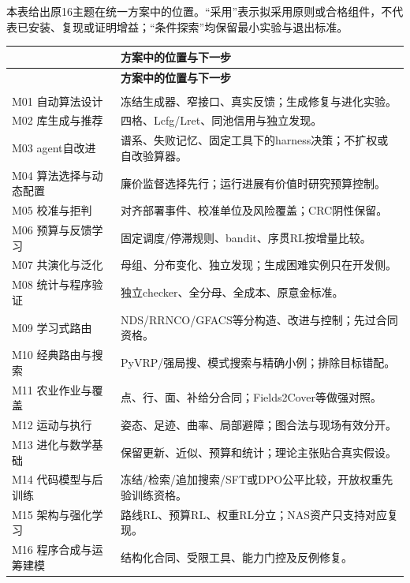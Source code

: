 \documentclass[11pt,a4paper]{article}
\newcommand{\bodytext}[1]{#1\par}
\begin{document}
\bodytext{本表给出原16主题在统一方案中的位置。“采用”表示拟采用原则或合格组件，不代表已安装、复现或证明增益；“条件探索”均保留最小实验与退出标准。}
\begingroup
\fontsize{9.6}{14.6}\selectfont
\setlength{\tabcolsep}{4pt}
\renewcommand{\arraystretch}{1.18}
\begin{longtable}{@{}>{\raggedright\arraybackslash}p{}>{\raggedright\arraybackslash}p{}@{}}
\toprule
{\sffamily\bfseries 主题} & {\sffamily\bfseries 方案中的位置与下一步} \\
\midrule
\endfirsthead
\toprule
{\sffamily\bfseries 主题} & {\sffamily\bfseries 方案中的位置与下一步} \\
\midrule
\endhead
\midrule
\multicolumn{2}{r}{\fontsize{8}{10}\selectfont\color{Muted}续下页}\\
\endfoot
\bottomrule
\endlastfoot
M01 自动算法设计 & 冻结生成器、窄接口、真实反馈；生成修复与进化实验。 \\
\addlinespace[4pt]
M02 库生成与推荐 & 四格、Lcfg/\allowbreak{}Lret、同池信用与独立发现。 \\
\addlinespace[4pt]
M03 agent自改进 & 谱系、失败记忆、固定工具下的harness决策；不扩权或自改验算器。 \\
\addlinespace[4pt]
M04 算法选择与动态配置 & 廉价监督选择先行；运行进展有价值时研究预算控制。 \\
\addlinespace[4pt]
M05 校准与拒判 & 对齐部署事件、校准单位及风险覆盖；CRC阴性保留。 \\
\addlinespace[4pt]
M06 预算与反馈学习 & 固定调度/\allowbreak{}停滞规则、bandit、序贯RL按增量比较。 \\
\addlinespace[4pt]
M07 共演化与泛化 & 母组、分布变化、独立发现；生成困难实例只在开发侧。 \\
\addlinespace[4pt]
M08 统计与程序验证 & 独立checker、全分母、全成本、原意金标准。 \\
\addlinespace[4pt]
M09 学习式路由 & NDS/\allowbreak{}RRNCO/\allowbreak{}GFACS等分构造、改进与控制；先过合同资格。 \\
\addlinespace[4pt]
M10 经典路由与搜索 & PyVRP/\allowbreak{}强局搜、模式搜索与精确小例；排除目标错配。 \\
\addlinespace[4pt]
M11 农业作业与覆盖 & 点、行、面、补给分合同；Fields2Cover等做强对照。 \\
\addlinespace[4pt]
M12 运动与执行 & 姿态、足迹、曲率、局部避障；图合法与现场有效分开。 \\
\addlinespace[4pt]
M13 进化与数学基础 & 保留更新、近似、预算和统计；理论主张贴合真实假设。 \\
\addlinespace[4pt]
M14 代码模型与后训练 & 冻结/\allowbreak{}检索/\allowbreak{}追加搜索/\allowbreak{}SFT或DPO公平比较，开放权重先验训练资格。 \\
\addlinespace[4pt]
M15 架构与强化学习 & 路线RL、预算RL、权重RL分立；NAS资产只支持对应复现。 \\
\addlinespace[4pt]
M16 程序合成与运筹建模 & 结构化合同、受限工具、能力门控及反例修复。 \\
\end{longtable}
\end{document}
